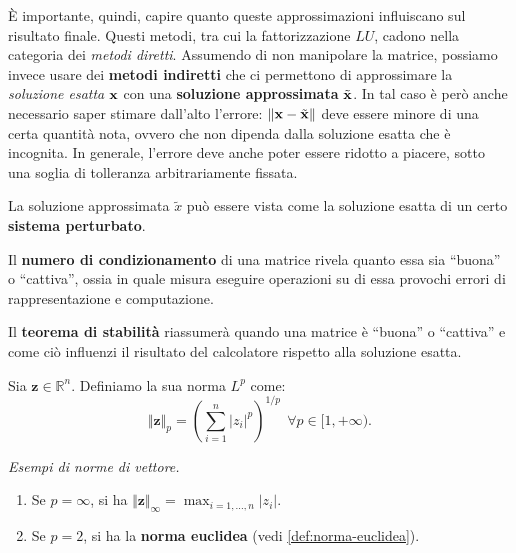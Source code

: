 È importante, quindi, capire quanto queste approssimazioni influiscano sul risultato finale. Questi metodi, tra cui la fattorizzazione $LU$, cadono nella categoria dei \textit{metodi diretti}. Assumendo di non manipolare la matrice, possiamo invece usare dei \textbf{metodi indiretti} che ci permettono di approssimare la \textit{soluzione esatta} $\mathbf{x}$ con una \textbf{soluzione approssimata} $\tilde{\mathbf{x}}$.
In tal caso è però anche necessario saper stimare dall'alto l'errore: $\left\Vert \mathbf{x} -\tilde{\mathbf{x}}\right\Vert$ deve essere minore di una certa quantità nota, ovvero che non dipenda dalla soluzione esatta che è incognita.
In generale, l'errore deve anche poter essere ridotto a piacere, sotto una soglia di tolleranza arbitrariamente fissata.

La soluzione approssimata $\tilde{x}$ può essere vista come la soluzione esatta di un certo \textbf{sistema perturbato}.

Il \textbf{numero di condizionamento} di una matrice rivela quanto essa sia ``buona'' o ``cattiva'', ossia in quale misura eseguire operazioni su di essa provochi errori di rappresentazione e computazione.

Il \textbf{teorema di stabilità} riassumerà quando una matrice è ``buona'' o ``cattiva'' e come ciò influenzi il risultato del calcolatore rispetto alla soluzione esatta.
\begin{definition}
Sia $\displaystyle \mathbf{z} \in \mathbb{R}^{n}$. Definiamo la sua norma $L^p$ come:
\begin{equation*}
\Vert \mathbf{z}\Vert _{p} =\left(\sum ^{n}_{i=1} |z_{i} |^{p}\right)^{1/p} \ \ \forall p\in [ 1,+\infty ).
\end{equation*}
\label{def:norma-vettore}
\end{definition}
\textit{Esempi di norme di vettore.}
\begin{enumerate}
\item Se $p=\infty $, si ha $\Vert \mathbf{z}\Vert _{\infty } =\max_{i=1,\dotsc ,n} |z_{i} |$.
\item Se $\displaystyle p=2$, si ha la \textbf{norma euclidea} (vedi \ref{def:norma-euclidea}).
\end{enumerate}

